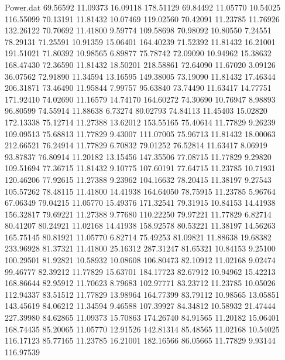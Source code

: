 \begin{filecontents}{Power.dat}
  69.56592   11.09373   16.09118  178.51129
  69.84492   11.05770   10.54025  116.55099
  70.13191   11.81432   10.07469  119.02560
  70.42091   11.23785   11.76926  132.26122
  70.70692   11.41800    9.59774  109.58698
  70.98092   10.80550    7.24551   78.29131
  71.25591   10.91359   15.06401  164.40239
  71.52392   11.81432   16.21001  191.51021
  71.80392   10.98565    6.89877   75.78742
  72.09090   10.94962   15.38632  168.47430
  72.36590   11.81432   18.50201  218.58861
  72.64090   11.67020    3.09126   36.07562
  72.91890   11.34594   13.16595  149.38005
  73.19090   11.81432   17.46344  206.31871
  73.46490   11.95844    7.99757   95.63840
  73.74490   11.63417   14.77751  171.92410
  74.02690   11.16579   14.74170  164.60272
  74.30690   10.76947    8.98893   96.80599
  74.55914   11.88638    6.73274   80.02793
  74.84113   11.45403   15.02820  172.13338
  75.12714   11.27388   13.62012  153.55165
  75.40614   11.77829    9.26239  109.09513
  75.68813   11.77829    9.43007  111.07005
  75.96713   11.81432   18.00063  212.66521
  76.24914   11.77829    6.70832   79.01252
  76.52814   11.63417    8.06919   93.87837
  76.80914   11.20182   13.15456  147.35506
  77.08715   11.77829    9.29820  109.51694
  77.36715   11.81432    9.10775  107.60191
  77.64715   11.23785   10.71931  120.46206
  77.92615   11.27388    9.23962  104.16632
  78.20415   11.38197    9.27543  105.57262
  78.48115   11.41800   14.41938  164.64050
  78.75915   11.23785    5.96764   67.06349
  79.04215   11.05770   15.49376  171.32541
  79.31915   10.84153   14.41938  156.32817
  79.69221   11.27388    9.77680  110.22250
  79.97221   11.77829    6.82714   80.41207
  80.24921   11.02168   14.41938  158.92578
  80.53221   11.38197   14.56263  165.75145
  80.81921   11.05770    6.82714   75.49253
  81.09821   11.88638   19.68382  233.96928
  81.37321   11.41800   25.16312  287.31247
  81.65321   10.84153    9.25100  100.29501
  81.92821   10.58932   10.08608  106.80473
  82.10912   11.02168    9.02474   99.46777
  82.39212   11.77829   15.63701  184.17723
  82.67912   10.94962   15.42213  168.86644
  82.95912   11.70623    8.79683  102.97771
  83.23712   11.23785   10.05026  112.94337
  83.51512   11.77829   13.98964  164.77399
  83.79112   10.98565   13.05851  143.45619
  84.06212   11.34594    9.46588  107.39927
  84.34812   10.58932   21.47444  227.39980
  84.62865   11.09373   15.70863  174.26740
  84.91565   11.20182   15.06401  168.74435
  85.20065   11.05770   12.91526  142.81314
  85.48565   11.02168   10.54025  116.17123
  85.77165   11.23785   16.21001  182.16566
  86.05665   11.77829    9.93144  116.97539

\end{filecontents}
